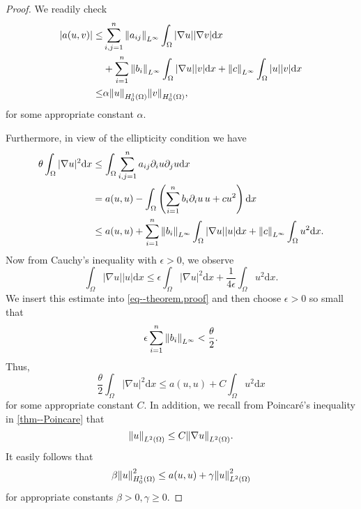 \documentclass[11pt]{article}
\begin{document}
			\begin{proof}
				We readily check 
				\begin{align*}
					|a(u,v)|\le&\sum_{i,j=1}^n\norm{a_{ij}}_{L^\infty}\int_\Omega|\nabla u||\nabla v|\mathrm{d}x\\
					&+\sum_{i=1}^n\norm{b_i}_{L^\infty}\int_\Omega|\nabla u||v|\mathrm{d}x+\norm{c}_{L^\infty}\int_\Omega|u||v|\mathrm{d}x\\
					\le&\alpha\norm{u}_{H^1_0(\Omega)}\norm{v}_{H^1_0(\Omega)},
				\end{align*}
				for some appropriate constant $\alpha$.

				Furthermore, in view of the ellipticity condition we have
				\begin{equation}\label{eq--theorem.proof}
					\begin{aligned}
						\theta\int_\Omega|\nabla u|^2\mathrm{d}x&\le\int_\Omega\sum_{i,j=1}^na_{ij}\partial_iu\partial_ju \mathrm{d}x\\
						&=a(u,u)-\int_\Omega\left(\sum_{i=1}^nb_i\partial_i u\,u+cu^2\right) \mathrm{d}x\\
						&\le a(u,u)+\sum_{i=1}^n\norm{b_i}_{L^\infty}\int_\Omega|\nabla u||u|\mathrm{d}x+\norm{c}_{L^\infty}\int_\Omega u^2\mathrm{d}x.
					\end{aligned}
				\end{equation}
				Now from Cauchy's inequality with $\epsilon>0$, we observe
				\begin{equation*}
					\int_\Omega|\nabla u||u|\mathrm{d}x\le\epsilon\int_\Omega|\nabla u|^2\mathrm{d}x+\frac{1}{4\epsilon}\int_\Omega u^2\mathrm{d}x.
				\end{equation*}
				We insert this estimate into \eqref{eq--theorem.proof} and then choose $\epsilon>0$ so small that
				\begin{equation*}
					\epsilon\sum_{i=1}^n\norm{b_i}_{L^\infty}<\frac{\theta}{2}.
				\end{equation*}
				Thus,
				\begin{equation*}
					\frac{\theta}{2}\int_\Omega|\nabla u|^2\mathrm{d}x\le a(u,u)+C\int_\Omega u^2\mathrm{d}x
				\end{equation*}
				for some appropriate constant $C$. In addition, we recall from Poincaré's inequality in \autoref{thm--Poincare} that
				\begin{equation*}
					\norm{u}_{L^2 (\Omega)}\le C\norm{\nabla u}_{L^2(\Omega)}.
				\end{equation*}
				It easily follows that
				\begin{equation*}
					\beta\norm{u}^2_{H^1_0(\Omega)}\le a(u,u)+\gamma\norm{u}^2_{L^2(\Omega)}
				\end{equation*}
				for appropriate constants $\beta>0,\gamma\ge0$.
			\end{proof}
			
\end{document}
